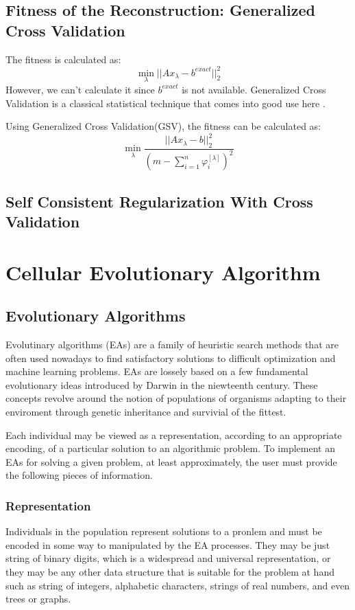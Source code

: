 \documentclass{article}
\begin{document}
\subsection{Fitness of the Reconstruction: Generalized Cross Validation}
The fitness is calculated as:
\begin{equation}
	\mathop {\min }\limits_\lambda  ||A{x_\lambda } - {b^{exact}}||_2^2
\end{equation}
However, we can't calculate it since \(b^{exact}\) is not available. Generalized 
Cross Validation is a classical statistical technique that comes into good use
here \cite{hansen2010discrete}.

Using Generalized Cross Validation(GSV), the fitness can be calculated as:
\begin{equation}
	\mathop {\min }\limits_\lambda  \frac{{||A{x_\lambda } - b||_2^2}}{{{{(m -
	\sum\nolimits_{i = 1}^n {\varphi _i^{[\lambda ]}} )}^2}}}
	\label{eq:disintegral}
\end{equation}
\subsection{Self Consistent Regularization With Cross Validation}


\section{Cellular Evolutionary Algorithm}
\subsection{Evolutionary Algorithms}
Evolutinary algorithms (EAs) are a family of heuristic search methods that are
often used nowadays to find satisfactory solutions to difficult optimization and
machine learning problems. EAs are lossely based on a few fundamental
evolutionary ideas introduced by Darwin in the niewteenth century. These
concepts revolve around the notion of populations of organisms adapting to their
enviroment through genetic inheritance and survivial of the fittest.

Each individual may be viewed as a representation, according to an appropriate
encoding, of a particular solution to an algorithmic problem. To implement an
EAs for solving a given problem, at least approximately, the user must provide
the following pieces of information.

\subsubsection{Representation}
Individuals in the population represent solutions to a pronlem and must be
encoded in some way to manipulated by the EA processes. They may be just string
of binary digits, which is a widespread and universal representation, or they
may be any other data structure that is suitable for the problem at hand such as
string of integers, alphabetic characters, strings of real numbers, and even
trees or graphs.
\end{document}
